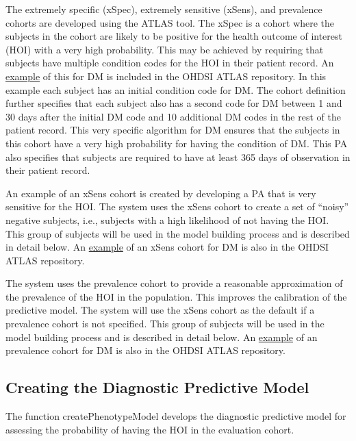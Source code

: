 \documentclass[]{article}
\begin{document}
The extremely specific (xSpec), extremely sensitive (xSens), and
prevalence cohorts are developed using the ATLAS tool. The xSpec is a
cohort where the subjects in the cohort are likely to be positive for
the health outcome of interest (HOI) with a very high probability. This
may be achieved by requiring that subjects have multiple condition codes
for the HOI in their patient record. An
\href{http://www.ohdsi.org/web/atlas/\#/cohortdefinition/1769699}{example}
of this for DM is included in the OHDSI ATLAS repository. In this
example each subject has an initial condition code for DM. The cohort
definition further specifies that each subject also has a second code
for DM between 1 and 30 days after the initial DM code and 10 additional
DM codes in the rest of the patient record. This very specific algorithm
for DM ensures that the subjects in this cohort have a very high
probability for having the condition of DM. This PA also specifies that
subjects are required to have at least 365 days of observation in their
patient record.

An example of an xSens cohort is created by developing a PA that is very
sensitive for the HOI. The system uses the xSens cohort to create a set
of ``noisy'' negative subjects, i.e., subjects with a high likelihood of
not having the HOI. This group of subjects will be used in the model
building process and is described in detail below. An
\href{http://www.ohdsi.org/web/atlas/\#/cohortdefinition/1770120}{example}
of an xSens cohort for DM is also in the OHDSI ATLAS repository.

The system uses the prevalence cohort to provide a reasonable
approximation of the prevalence of the HOI in the population. This
improves the calibration of the predictive model. The system will use
the xSens cohort as the default if a prevalence cohort is not specified.
This group of subjects will be used in the model building process and is
described in detail below. An
\href{http://www.ohdsi.org/web/atlas/\#/cohortdefinition/1770119}{example}
of an prevalence cohort for DM is also in the OHDSI ATLAS repository.

\hypertarget{creating-the-diagnostic-predictive-model}{%
\subsection{Creating the Diagnostic Predictive
Model}\label{creating-the-diagnostic-predictive-model}}

The function createPhenotypeModel develops the diagnostic predictive
model for assessing the probability of having the HOI in the evaluation
cohort.
\end{document}
